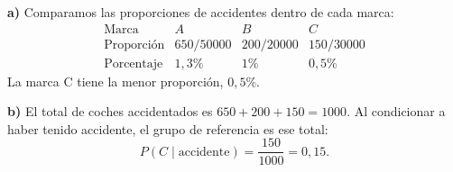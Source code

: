\textbf{a)} Comparamos las proporciones de accidentes dentro de cada marca:
\[
 \begin{array}{c|ccc}
 \text{Marca}&A&B&C\\\hline
 \text{Proporción}&650/50000&200/20000&150/30000\\
 \text{Porcentaje}&1{,}3\%&1\%&0{,}5\%
 \end{array}
\]
La marca C tiene la menor proporción, $\boxed{0{,}5\%}$.

\textbf{b)} El total de coches accidentados es $650+200+150=1000$. Al condicionar a haber tenido accidente, el grupo de referencia es ese total:
\[
 P(C\mid\text{accidente})=\frac{150}{1000}=\boxed{0{,}15}.
\]
